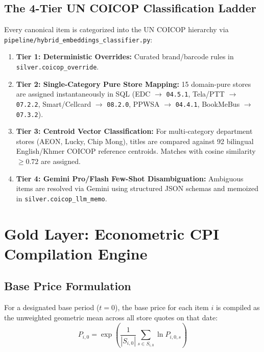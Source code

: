 \documentclass[11pt,a4paper]{article}
\begin{document}
\subsection{The 4-Tier UN COICOP Classification Ladder}
Every canonical item is categorized into the UN COICOP hierarchy via \texttt{pipeline/hybrid\_embeddings\_classifier.py}:
\begin{enumerate}
    \item \textbf{Tier 1: Deterministic Overrides:} Curated brand/barcode rules in \texttt{silver.coicop\_override}.
    \item \textbf{Tier 2: Single-Category Pure Store Mapping:} 15 domain-pure stores are assigned instantaneously in SQL (EDC $\rightarrow$ \texttt{04.5.1}, Tela/PTT $\rightarrow$ \texttt{07.2.2}, Smart/Cellcard $\rightarrow$ \texttt{08.2.0}, PPWSA $\rightarrow$ \texttt{04.4.1}, BookMeBus $\rightarrow$ \texttt{07.3.2}).
    \item \textbf{Tier 3: Centroid Vector Classification:} For multi-category department stores (AEON, Lucky, Chip Mong), titles are compared against 92 bilingual English/Khmer COICOP reference centroids. Matches with cosine similarity $\ge 0.72$ are assigned.
    \item \textbf{Tier 4: Gemini Pro/Flash Few-Shot Disambiguation:} Ambiguous items are resolved via Gemini using structured JSON schemas and memoized in \texttt{silver.coicop\_llm\_memo}.
\end{enumerate}

\newpage

\section{Gold Layer: Econometric CPI Compilation Engine}

\subsection{Base Price Formulation}
For a designated base period ($t=0$), the base price for each item $i$ is compiled as the unweighted geometric mean across all store quotes on that date:
\begin{equation}
P_{i, 0} = \exp \left( \frac{1}{|S_{i, 0}|} \sum_{s \in S_{i, 0}} \ln P_{i, 0, s} \right)
\end{equation}
\end{document}

